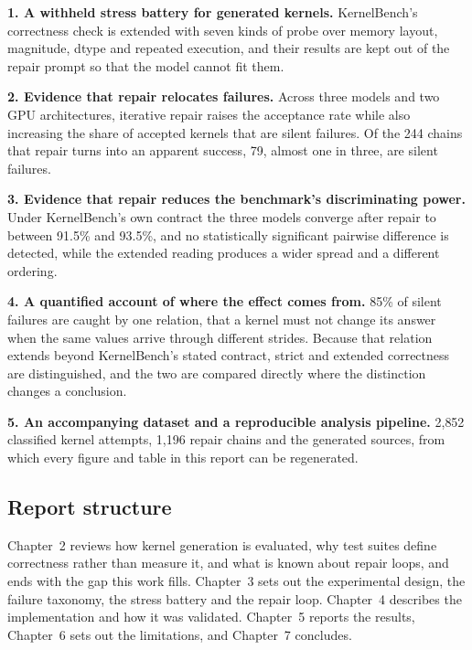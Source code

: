 \documentclass[12pt]{article}
\begin{document}
\textbf{1. A withheld stress battery for generated kernels.} KernelBench's
correctness check is extended with seven kinds of probe over memory layout,
magnitude, dtype and repeated execution, and their results are kept out of
the repair prompt so that the model cannot fit them.

\textbf{2. Evidence that repair relocates failures.} Across three models and
two GPU architectures, iterative repair raises the acceptance rate while also
increasing the share of accepted kernels that are silent failures. Of the 244 chains
that repair turns into an apparent success, 79, almost one in three, are silent
failures.

\textbf{3. Evidence that repair reduces the benchmark's discriminating power.}
Under KernelBench's own contract the three models converge after repair to
between 91.5\% and 93.5\%, and no statistically significant pairwise difference
is detected, while the extended reading produces a wider spread and a different
ordering.

\textbf{4. A quantified account of where the effect comes from.} 85\% of silent
failures are caught by one relation, that a kernel must not change its answer
when the same values arrive through different strides. Because that relation
extends beyond KernelBench's stated contract, strict and extended correctness
are distinguished, and the two are compared directly where the distinction
changes a conclusion.

\textbf{5. An accompanying dataset and a reproducible analysis pipeline.} 2{,}852 classified
kernel attempts, 1{,}196 repair chains and the generated sources, from which
every figure and table in this report can be regenerated.

\subsection{Report structure}

Chapter~2 reviews how kernel generation is evaluated, why test suites define
correctness rather than measure it, and what is known about repair loops, and
ends with the gap this work fills. Chapter~3 sets out the experimental design,
the failure taxonomy, the stress battery and the repair loop. Chapter~4
describes the implementation and how it was validated. Chapter~5 reports the
results, Chapter~6 sets out the limitations, and Chapter~7 concludes.

\end{document}
